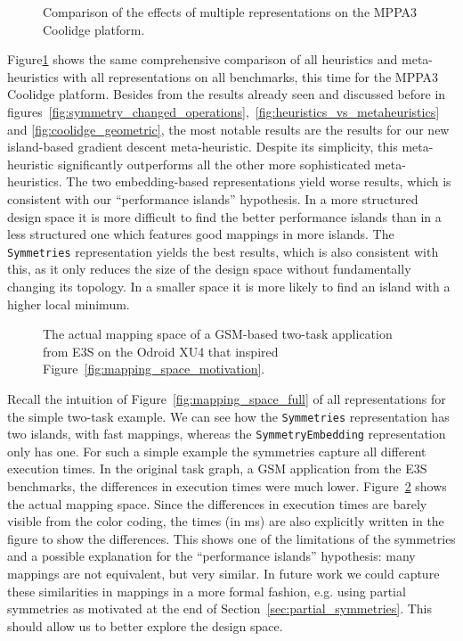 \begin{figure}[h]
	\centering
   \resizebox{0.95\textwidth}{!}{}
	\caption{Comparison of the effects of multiple representations on the MPPA3 Coolidge platform.}
	\label{fig:multiple_representations_coolidge}
\end{figure}

Figure\ref{fig:multiple_representations_coolidge} shows the same comprehensive comparison of all heuristics and meta-heuristics with all representations on all benchmarks, this time for the MPPA3 Coolidge platform. 
Besides from the results already seen and discussed before in figures~\ref{fig:symmetry_changed_operations},~\ref{fig:heuristics_vs_metaheuristics} and \ref{fig:coolidge_geometric}, the most notable results are the results for our new island-based gradient descent meta-heuristic.
Despite its simplicity, this meta-heuristic significantly outperforms all the other more sophisticated meta-heuristics.
The two embedding-based representations yield worse results, which is consistent with our ``performance islands'' hypothesis.
In a more structured design space it is more difficult to find the better performance islands than in a less structured one which features good mappings in more islands.
The \texttt{Symmetries} representation yields the best results, which is also consistent with this, as it only reduces the size of the design space without fundamentally changing its topology.
In a smaller space it is more likely to find an island with a higher local minimum.

\begin{figure}[h]
	\centering
	\caption{The actual mapping space of a \acs{GSM}-based two-task application from \ac{E3S} on the Odroid XU4 that inspired Figure~\ref{fig:mapping_space_motivation}.}
	\label{fig:gsm_actual_mapping_space}
\end{figure}


Recall the intuition of Figure~\ref{fig:mapping_space_full} of all representations for the simple two-task example.
We can see how the \texttt{Symmetries} representation has two islands, with fast mappings, whereas the \texttt{SymmetryEmbedding} representation only has one.
For such a simple example the symmetries capture all different execution times.
In the original task graph, a \acs{GSM} application from the \ac{E3S} benchmarks, the differences in execution times were much lower. 
Figure~\ref{fig:gsm_actual_mapping_space} shows the actual mapping space. Since the differences in execution times are barely visible from the color coding, the times (in ms) are also explicitly written in the figure to show the differences.
This shows one of the limitations of the symmetries and a possible explanation for the ``performance islands'' hypothesis: many mappings are not equivalent, but very similar.
In future work we could capture these similarities in mappings in a more formal fashion, e.g. using partial symmetries as motivated at the end of Section~\ref{sec:partial_symmetries}.
This should allow us to better explore the design space.